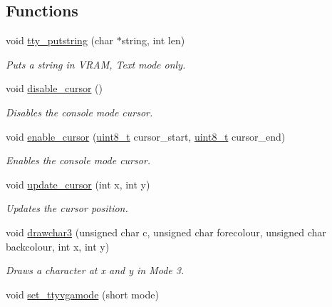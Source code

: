\subsection*{Functions}
\begin{DoxyCompactItemize}
\item 
void \hyperlink{a00167_a5b5bf610a57f3c59b2851fa2652081ec_a5b5bf610a57f3c59b2851fa2652081ec}{tty\+\_\+putstring} (char $\ast$string, int len)
\begin{DoxyCompactList}\small\item\em Puts a string in V\+R\+AM, Text mode only. \end{DoxyCompactList}\item 
void \hyperlink{a00167_a3d09038c7b6436e60b228f2f3f451f6a_a3d09038c7b6436e60b228f2f3f451f6a}{disable\+\_\+cursor} ()
\begin{DoxyCompactList}\small\item\em Disables the console mode cursor. \end{DoxyCompactList}\item 
void \hyperlink{a00167_afe197dc4dbfa6036ef04abd2aeeeca2d_afe197dc4dbfa6036ef04abd2aeeeca2d}{enable\+\_\+cursor} (\hyperlink{a00134_aba7bc1797add20fe3efdf37ced1182c5_aba7bc1797add20fe3efdf37ced1182c5}{uint8\+\_\+t} cursor\+\_\+start, \hyperlink{a00134_aba7bc1797add20fe3efdf37ced1182c5_aba7bc1797add20fe3efdf37ced1182c5}{uint8\+\_\+t} cursor\+\_\+end)
\begin{DoxyCompactList}\small\item\em Enables the console mode cursor. \end{DoxyCompactList}\item 
void \hyperlink{a00167_a492f5021d7340613e732ef37bbaa04e4_a492f5021d7340613e732ef37bbaa04e4}{update\+\_\+cursor} (int x, int y)
\begin{DoxyCompactList}\small\item\em Updates the cursor position. \end{DoxyCompactList}\item 
void \hyperlink{a00167_acb9a978008cfa67b0038e85eb56d2d41_acb9a978008cfa67b0038e85eb56d2d41}{drawchar3} (unsigned char c, unsigned char forecolour, unsigned char backcolour, int x, int y)
\begin{DoxyCompactList}\small\item\em Draws a character at x and y in Mode 3. \end{DoxyCompactList}\item 
void \hyperlink{a00167_aaf55ee008e2e63ca97eacae371646db7_aaf55ee008e2e63ca97eacae371646db7}{set\+\_\+ttyvgamode} (short mode)

\end{DoxyCompactItemize}

